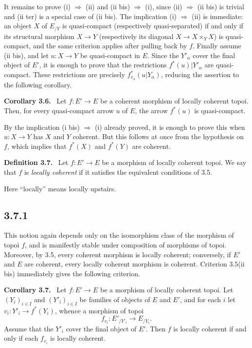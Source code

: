 \documentclass[11pt]{article}
\newenvironment{statement}[1]{\par\medskip\noindent\textbf{#1.}\ }{\par\medskip}
\begin{document}
It remains to prove (i) \(\Rightarrow\) (ii) and (ii bis) \(\Rightarrow\) (i), since (ii) \(\Rightarrow\) (ii bis) is trivial and (ii ter) is a special case of (ii bis). The implication (i) \(\Rightarrow\) (ii) is immediate: an object \(X\) of \(E_{/Y}\) is quasi-compact (respectively quasi-separated) if and only if its structural morphism \(X\to Y\) (respectively its diagonal \(X\to X\times_YX\)) is quasi-compact, and the same criterion applies after pulling back by \(f\). Finally assume (ii bis), and let \(u:X\to Y\) be quasi-compact in \(E\). Since the \(Y'_\alpha\) cover the final object of \(E'\), it is enough to prove that the restrictions \(f^*(u)|Y'_\alpha\) are quasi-compact. These restrictions are precisely \(f^*_{v_\alpha}(u|Y_\alpha)\), reducing the assertion to the following corollary.

\begin{statement}{Corollary 3.6}
Let \(f:E'\to E\) be a coherent morphism of locally coherent topoi. Then, for every quasi-compact arrow \(u\) of \(E\), the arrow \(f^*(u)\) is quasi-compact.
\end{statement}

By the implication (i bis) \(\Rightarrow\) (i) already proved, it is enough to prove this when \(u:X\to Y\) has \(X\) and \(Y\) coherent. But this follows at once from the hypothesis on \(f\), which implies that \(f^*(X)\) and \(f^*(Y)\) are coherent.

\begin{statement}{Definition 3.7}
Let \(f:E'\to E\) be a morphism of locally coherent topoi. We say that \(f\) is \emph{locally coherent} if it satisfies the equivalent conditions of 3.5.
\end{statement}

Here ``locally'' means locally upstairs.

\subsection*{3.7.1}
This notion again depends only on the isomorphism class of the morphism of topoi \(f\), and is manifestly stable under composition of morphisms of topoi. Moreover, by 3.5, every coherent morphism is locally coherent; conversely, if \(E'\) and \(E\) are coherent, every locally coherent morphism is coherent. Criterion 3.5(ii bis) immediately gives the following criterion.

\begin{statement}{Corollary 3.7}
Let \(f:E'\to E\) be a morphism of locally coherent topoi. Let \((Y_i)_{i\in I}\) and \((Y'_i)_{i\in I}\) be families of objects of \(E\) and \(E'\), and for each \(i\) let \(v_i:Y'_i\to f^*(Y_i)\), whence a morphism of topoi
\[
  f_{v_i}:E'_{/Y'_i}\to E_{/Y_i}.
\]
Assume that the \(Y'_i\) cover the final object of \(E'\). Then \(f\) is locally coherent if and only if each \(f_{v_i}\) is locally coherent.
\end{statement}
\end{document}
